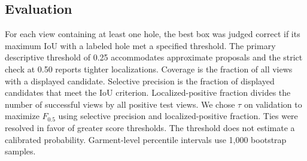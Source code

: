 \subsection{Evaluation}

For each view containing at least one hole, the best box was judged correct if its maximum IoU with a labeled hole met a specified threshold. The primary descriptive threshold of 0.25 accommodates approximate proposals and the strict check at 0.50 reports tighter localizations. Coverage is the fraction of all views with a displayed candidate. Selective precision is the fraction of displayed candidates that meet the IoU criterion. Localized-positive fraction divides the number of successful views by all positive test views. We chose $\tau$ on validation to maximize $F_{0.5}$ using selective precision and localized-positive fraction. Ties were resolved in favor of greater score thresholds. The threshold does not estimate a calibrated probability. Garment-level percentile intervals use 1,000 bootstrap samples.
